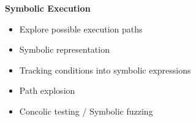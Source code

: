 \begin{frame}
	\begin{columns}[t]
		\begin{column}{0.4\textwidth}
			\textbf{Symbolic Execution}
			\small
			\begin{itemize}
				\item Explore possible execution paths
				\item Symbolic representation
                \item Tracking conditions into symbolic expressions
				\item Path explosion
				\item Concolic testing / Symbolic fuzzing
			\end{itemize}
		\end{column}
	\end{columns}
\end{frame}
